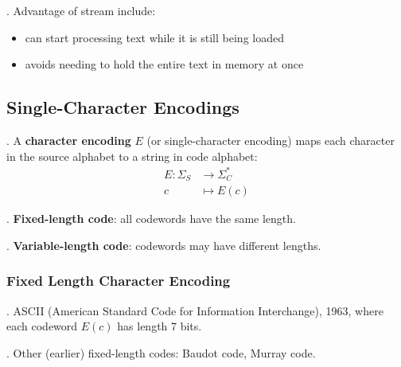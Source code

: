 \documentclass{article}
\begin{document}
\begin{comm}[].
    Advantage of stream include: \begin{itemize}
        \item can start processing text while it is still being loaded 
        \item avoids needing to hold the entire text in memory at once
    \end{itemize}
\end{comm}

\subsection{Single-Character Encodings} 

\begin{deff}.
    A \textbf{character encoding} $E$ (or single-character encoding) maps each character in the source alphabet to a string in code alphabet: 
    \begin{align*}
        E : \Sigma_S & \rightarrow \Sigma_C^* \\ 
        c & \mapsto E(c)
    \end{align*}
\end{deff}

\begin{deff}.
    \textbf{Fixed-length code}: all codewords have the same length. 
\end{deff}

\begin{deff}.
    \textbf{Variable-length code}: codewords may have different lengths. 
\end{deff}

\subsubsection{Fixed Length Character Encoding}

\begin{examplee}[].
    ASCII (American Standard Code for Information  Interchange), 1963, where each codeword $E(c)$ has length 7 bits. 
\end{examplee}

\begin{examplee}[].
    Other (earlier) fixed-length codes: Baudot code, Murray code. 
\end{examplee}
\end{document}
